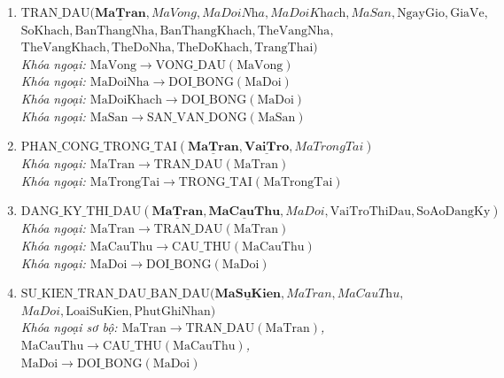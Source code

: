\begin{enumerate}
    \item $\text{TRAN\_DAU}(\underline{\mathbf{MaTran}}, \textit{MaVong}, \textit{MaDoiNha}, \textit{MaDoiKhach}, \textit{MaSan}, \text{NgayGio}, \text{GiaVe},$ \\
    $\text{SoKhach}, \text{BanThangNha}, \text{BanThangKhach}, \text{TheVangNha},$ \\
    $\text{TheVangKhach}, \text{TheDoNha}, \text{TheDoKhach}, \text{TrangThai})$\\
    \textit{Khóa ngoại: $\text{MaVong} \rightarrow \text{VONG\_DAU}(\text{MaVong})$}\\
    \textit{Khóa ngoại: $\text{MaDoiNha} \rightarrow \text{DOI\_BONG}(\text{MaDoi})$}\\
    \textit{Khóa ngoại: $\text{MaDoiKhach} \rightarrow \text{DOI\_BONG}(\text{MaDoi})$}\\
    \textit{Khóa ngoại: $\text{MaSan} \rightarrow \text{SAN\_VAN\_DONG}(\text{MaSan})$}
    
    \item $\text{PHAN\_CONG\_TRONG\_TAI}(\underline{\mathbf{MaTran}}, \underline{\mathbf{VaiTro}}, \textit{MaTrongTai})$\\
    \textit{Khóa ngoại: $\text{MaTran} \rightarrow \text{TRAN\_DAU}(\text{MaTran})$}\\
    \textit{Khóa ngoại: $\text{MaTrongTai} \rightarrow \text{TRONG\_TAI}(\text{MaTrongTai})$}
    
    \item $\text{DANG\_KY\_THI\_DAU}(\underline{\mathbf{MaTran}}, \underline{\mathbf{MaCauThu}}, \textit{MaDoi}, \text{VaiTroThiDau}, \text{SoAoDangKy})$\\
    \textit{Khóa ngoại: $\text{MaTran} \rightarrow \text{TRAN\_DAU}(\text{MaTran})$}\\
    \textit{Khóa ngoại: $\text{MaCauThu} \rightarrow \text{CAU\_THU}(\text{MaCauThu})$}\\
    \textit{Khóa ngoại: $\text{MaDoi} \rightarrow \text{DOI\_BONG}(\text{MaDoi})$}
    
    \item $\text{SU\_KIEN\_TRAN\_DAU\_BAN\_DAU}(\underline{\mathbf{MaSuKien}}, \textit{MaTran}, \textit{MaCauThu},$ \\
    $\textit{MaDoi}, \text{LoaiSuKien}, \text{PhutGhiNhan})$\\
    \textit{Khóa ngoại sơ bộ: $\text{MaTran} \rightarrow \text{TRAN\_DAU}(\text{MaTran})$, $\text{MaCauThu} \rightarrow \text{CAU\_THU}(\text{MaCauThu})$,} \\
    \textit{$\text{MaDoi} \rightarrow \text{DOI\_BONG}(\text{MaDoi})$}
\end{enumerate}


